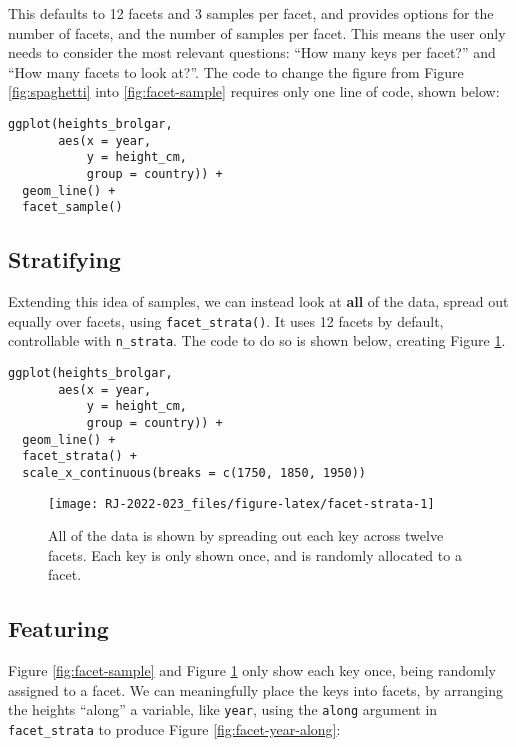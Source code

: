 This defaults to 12 facets and 3 samples per facet, and provides options for the number of facets, and the number of samples per facet. This means the user only needs to consider the most relevant questions: ``How many keys per facet?'' and ``How many facets to look at?''. The code to change the figure from Figure \ref{fig:spaghetti} into \ref{fig:facet-sample} requires only one line of code, shown below:

\begin{verbatim}
ggplot(heights_brolgar,
       aes(x = year,
           y = height_cm,
           group = country)) + 
  geom_line() + 
  facet_sample()
\end{verbatim}

\hypertarget{stratifying}{%
\subsection{Stratifying}\label{stratifying}}

Extending this idea of samples, we can instead look at \textbf{all} of the data, spread out equally over facets, using \texttt{facet\_strata()}. It uses 12 facets by default, controllable with \texttt{n\_strata}. The code to do so is shown below, creating Figure \ref{fig:facet-strata}.

\begin{verbatim}
ggplot(heights_brolgar,
       aes(x = year,
           y = height_cm,
           group = country)) + 
  geom_line() + 
  facet_strata() +
  scale_x_continuous(breaks = c(1750, 1850, 1950))
\end{verbatim}

\begin{figure}

{\centering \texttt{[image: RJ-2022-023\_files/figure-latex/facet-strata-1]} 

}

\caption{All of the data is shown by spreading out each key across twelve facets. Each key is only shown once, and is randomly allocated to a facet.}\label{fig:facet-strata}
\end{figure}

\hypertarget{featuring}{%
\subsection{Featuring}\label{featuring}}

Figure \ref{fig:facet-sample} and Figure \ref{fig:facet-strata} only show each key once, being randomly assigned to a facet. We can meaningfully place the keys into facets, by arranging the heights ``along'' a variable, like \texttt{year}, using the \texttt{along} argument in \texttt{facet\_strata} to produce Figure \ref{fig:facet-year-along}:

